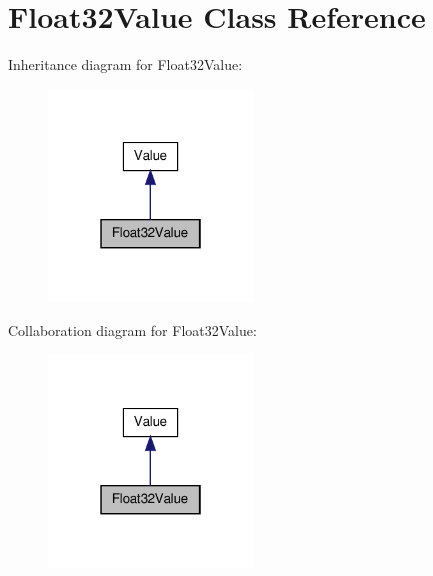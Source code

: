 \hypertarget{class_float32_value}{\section{Float32\-Value Class Reference}
\label{class_float32_value}
}


Inheritance diagram for Float32\-Value\-:
\nopagebreak
\begin{figure}[H]
\begin{center}
\leavevmode
\includegraphics[width=154pt]{class_float32_value__inherit__graph}
\end{center}
\end{figure}


Collaboration diagram for Float32\-Value\-:
\nopagebreak
\begin{figure}[H]
\begin{center}
\leavevmode
\includegraphics[width=154pt]{class_float32_value__coll__graph}
\end{center}
\end{figure}
